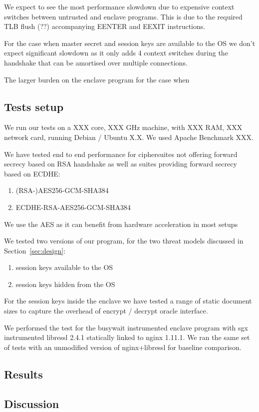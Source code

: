 \documentclass[../main.tex]{subfiles}
\begin{document}
We expect to see the most performance slowdown due to expensive context
switches between untrusted and enclave programs. This is due to the required
TLB flush (??) accompanying EENTER and EEXIT instructions.

For the case when master secret and session keys are available to the OS we
don't expect significant slowdown as it only adds 4 context switches during
the handshake that can be amortised over multiple connections.

The larger burden on the enclave program for the case when 


\subsection{Tests setup}
We run our tests on a XXX core, XXX GHz machine, with XXX RAM, XXX network
card, running Debian / Ubuntu X.X. We used Apache Benchmark XXX.

We have tested end to end performance for ciphersuites not offering forward
secrecy based on RSA handshake as well as suites providing forward secrecy
based on ECDHE:
\begin{enumerate}
  \item (RSA-)AES256-GCM-SHA384
  \item ECDHE-RSA-AES256-GCM-SHA384
\end{enumerate}
We use the AES as it can benefit from hardware acceleration in most setups

We tested two versions of our program, for the two threat models discussed in
Section~\ref{sec:design}:
\begin{enumerate}
  \item session keys available to the OS
  \item session keys hidden from the OS
\end{enumerate}

For the session keys inside the enclave we have tested a range of static
document sizes to capture the overhead of encrypt / decrypt oracle interface.

We performed the test for the busywait instrumented enclave program with sgx
instrumented libressl 2.4.1 statically linked to nginx 1.11.1. We ran the same
set of tests with an unmodified version of nginx+libressl for baseline
comparison.


\subsection{Results}

\subsection{Discussion}
\end{document}
